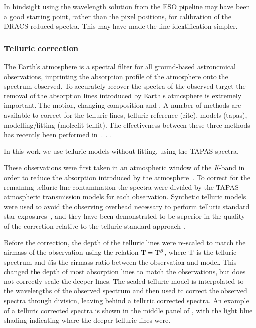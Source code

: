 




In hindsight using the wavelength solution from the {ESO} pipeline may have been a good starting point, rather than the pixel positions, for calibration of the {DRACS} reduced spectra. This may have made the line identification simpler.


\subsubsection{Telluric correction}
\label{subsec:telluric_correction}
The Earth's atmosphere is a spectral filter for all ground-based astronomical observations, imprinting the absorption profile of the atmosphere onto the spectrum observed. To accurately recover the spectra of the observed target the removal of the absorption lines introduced by Earth's atmosphere is extremely important. The motion, changing composition and .
A number of methods are available to correct for the telluric lines, telluric reference (cite), models (tapas), modelling/fitting (molecfit tellfit). The effectiveness between these three methods has recently been performed in~\cite{ulmer-moll_telluric_2018}. . .

In this work we use telluric models without fitting, using the {TAPAS} spectra.

These observations were first taken in an atmospheric window of the \emph{K}-band in order to reduce the absorption introduced by the atmosphere~\citep{barnes_hd_2008}.
 To correct for the remaining telluric line contamination the spectra were divided by the {TAPAS}\citep{bertaux_tapas_2014} atmospheric transmission models for each observation. Synthetic telluric models were used to avoid the observing overhead necessary to perform telluric standard star exposures~\citep{vacca_method_2003}, and they have been demonstrated to be superior in the quality of the correction relative to the telluric standard approach~\citep[e.g.][]{cotton_atmospheric_2014}.

Before the correction, the depth of the telluric lines were re-scaled to match the airmass of the observation using the relation \(\rm T = T^{\beta}\), where \(\rm T\) is the telluric spectrum and \(\beta\)is the airmass ratio between the observation and model. This changed the depth of most absorption lines to match the observations, but does not correctly scale the deeper lines. The scaled telluric model is interpolated to the wavelengths of the observed spectrum and then used to correct the observed spectra through division, leaving behind a telluric corrected spectra. An example of a telluric corrected spectra is shown in the middle panel of , with the light blue shading indicating where the deeper telluric lines were.

